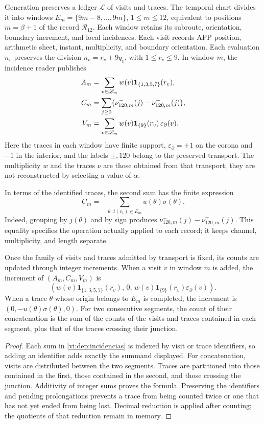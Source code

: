 Generation preserves a ledger \(\mathscr L\) of visits and traces.
The temporal chart divides it into windows
\(E_m=\{9m-8,\ldots,9m\}\), \(1\le m\le12\),
equivalent to positions \(m=\beta+1\) of the record
\(\mathcal R_{12}\). Each window retains its subroute,
orientation, boundary increment, and local incidences.
Each visit records APP position, arithmetic sheet, instant, multiplicity,
and boundary orientation. Each evaluation \(n_v\) preserves the
division \(n_v=r_v+9q_v\), with \(1\le r_v\le9\). In window
\(m\), the incidence reader publishes
\begin{align}
 A_m&=\sum_{v\in\mathscr L_m}w(v)
      \mathbf1_{\{1,3,5,7\}}(r_v),\notag\\
 C_m&=\sum_{j\ge0}
       \bigl(\nu^-_{120,m}(j)-\nu^+_{120,m}(j)\bigr),\notag\\
 V_m&=\sum_{v\in\mathscr L_m}w(v)
      \mathbf1_{\{9\}}(r_v)\,\varepsilon_{\partial}(v).
 \label{vi:dep:incidencias}
\end{align}
Here the traces in each window have finite support,
\(\varepsilon_{\partial}=+1\) on the corona and \(-1\) in the interior,
and the labels \(\pm,120\) belong to the preserved transport.
The multiplicity \(w\) and the traces \(\nu\) are those obtained from that
transport; they are not reconstructed by selecting a value of \(\alpha\).

In terms of the identified traces, the second sum has the finite
expression
\[
 C_m=-\sum_{\theta:\,t(v_1)\in E_m}u(\theta)\sigma(\theta).
\]
Indeed, grouping by \(j(\theta)\) and by sign produces
\(\nu^-_{120,m}(j)-\nu^+_{120,m}(j)\). This equality specifies
the operation actually applied to each record; it keeps
channel, multiplicity, and length separate.

\begin{proposition}
\label{vi:dep:libro-actualizacion}
Once the family of visits and traces admitted by transport is fixed, its
counts are updated through integer increments. When a
visit \(v\) in window \(m\) is added, the increment of \((A_m,C_m,V_m)\) is
\[
 \left(w(v)\mathbf1_{\{1,3,5,7\}}(r_v),\,0,\,
 w(v)\mathbf1_{\{9\}}(r_v)\varepsilon_\partial(v)\right).
\]
When a trace \(\theta\) whose origin belongs to \(E_m\) is completed,
the increment is \((0,-u(\theta)\sigma(\theta),0)\).
For two consecutive segments, the count of their concatenation is
the sum of the counts of the visits and traces contained in each
segment, plus that of the traces crossing their junction.
\end{proposition}
\begin{proof}
Each sum in \eqref{vi:dep:incidencias} is indexed by visit
or trace identifiers, so adding an identifier adds
exactly the summand displayed. For concatenation, visits
are distributed between the two segments. Traces are partitioned into
those contained in the first, those contained in the second, and those
crossing the junction. Additivity of integer sums proves
the formula. Preserving the identifiers and pending
prolongations prevents a trace from being counted twice or one that has
not yet ended from being lost. Decimal reduction is applied after
counting; the quotients of that reduction remain in memory.
\end{proof}

